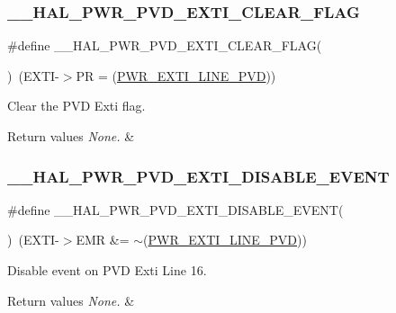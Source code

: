 \subsubsection{\texorpdfstring{\_\_HAL\_PWR\_PVD\_EXTI\_CLEAR\_FLAG}{\_\_HAL\_PWR\_PVD\_EXTI\_CLEAR\_FLAG}}
{\footnotesize\ttfamily \#define \+\_\+\+\_\+\+H\+A\+L\+\_\+\+P\+W\+R\+\_\+\+P\+V\+D\+\_\+\+E\+X\+T\+I\+\_\+\+C\+L\+E\+A\+R\+\_\+\+F\+L\+AG(\begin{DoxyParamCaption}{ }\end{DoxyParamCaption})~(E\+X\+TI-\/$>$PR = (\mbox{\hyperlink{group___p_w_r___p_v_d___e_x_t_i___line_ga43a49255649e03d2d2b6b12c5c379d2b}{P\+W\+R\+\_\+\+E\+X\+T\+I\+\_\+\+L\+I\+N\+E\+\_\+\+P\+VD}}))}



Clear the P\+VD Exti flag. 


\begin{DoxyRetVals}{Return values}
{\em None.} & \\
\hline
\end{DoxyRetVals}
\mbox{\label{group___p_w_r___exported___macro_ga8bd379e960497722450c7cea474a7e7a}} 
\subsubsection{\texorpdfstring{\_\_HAL\_PWR\_PVD\_EXTI\_DISABLE\_EVENT}{\_\_HAL\_PWR\_PVD\_EXTI\_DISABLE\_EVENT}}
{\footnotesize\ttfamily \#define \+\_\+\+\_\+\+H\+A\+L\+\_\+\+P\+W\+R\+\_\+\+P\+V\+D\+\_\+\+E\+X\+T\+I\+\_\+\+D\+I\+S\+A\+B\+L\+E\+\_\+\+E\+V\+E\+NT(\begin{DoxyParamCaption}{ }\end{DoxyParamCaption})~(E\+X\+TI-\/$>$E\+MR \&= $\sim$(\mbox{\hyperlink{group___p_w_r___p_v_d___e_x_t_i___line_ga43a49255649e03d2d2b6b12c5c379d2b}{P\+W\+R\+\_\+\+E\+X\+T\+I\+\_\+\+L\+I\+N\+E\+\_\+\+P\+VD}}))}



Disable event on P\+VD Exti Line 16. 


\begin{DoxyRetVals}{Return values}
{\em None.} & \\
\hline
\end{DoxyRetVals}
\mbox{\label{group___p_w_r___exported___macro_ga1ca57168205f8cd8d1014e6eb9465f2d}} 
